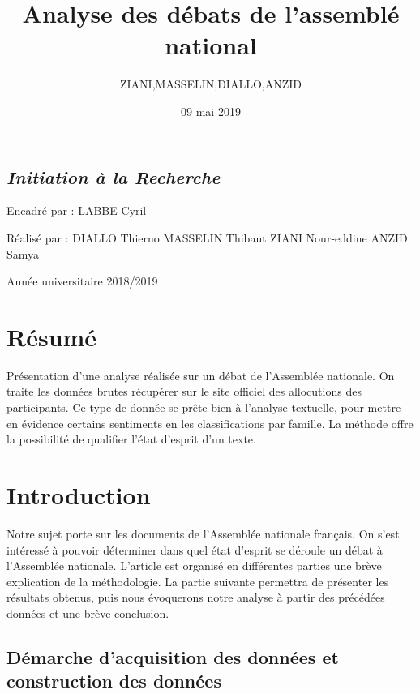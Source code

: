 \documentclass[]{article}
\title{Analyse des débats de l'assemblé national}
\author{ZIANI,MASSELIN,DIALLO,ANZID}
\date{09 mai 2019}
\begin{document}
\maketitle

\subsection{\texorpdfstring{\emph{Initiation à la
Recherche}}{Initiation à la Recherche}}\label{initiation-a-la-recherche}

Encadré par : LABBE Cyril

Réalisé par : DIALLO Thierno MASSELIN Thibaut ZIANI Nour-eddine ANZID
Samya

Année universitaire 2018/2019

\section{Résumé}\label{resume}

Présentation d'une analyse réalisée sur un débat de l'Assemblée
nationale. On traite les données brutes récupérer sur le site officiel
des allocutions des participants. Ce type de donnée se prête bien à
l'analyse textuelle, pour mettre en évidence certains sentiments en les
classifications par famille. La méthode offre la possibilité de
qualifier l'état d'esprit d'un texte.

\section{Introduction}\label{introduction}

Notre sujet porte sur les documents de l'Assemblée nationale français.
On s'est intéressé à pouvoir déterminer dans quel état d'esprit se
déroule un débat à l'Assemblée nationale. L'article est organisé en
différentes parties une brève explication de la méthodologie. La partie
suivante permettra de présenter les résultats obtenus, puis nous
évoquerons notre analyse à partir des précédées données et une brève
conclusion.

\subsection{Démarche d'acquisition des données et construction des
données}\label{demarche-dacquisition-des-donnees-et-construction-des-donnees}
\end{document}
